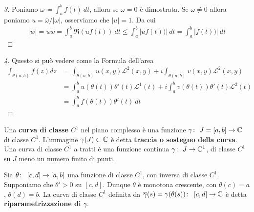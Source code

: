 \begin{proof}[3]
	Poniamo $\omega \coloneqq \int_{a}^{b} f(t)\ dt$, allora se $\omega = 0$ è dimostrata. Se $\omega \neq 0$ allora poniamo $u = \overline{\omega}/|\omega|$, osserviamo che $|u|=1$. Da cui
	\begin{equation*}
	\begin{aligned}
	|w| = uw = \int_{a}^b \Re(uf(t))\ dt \le \int_{a}^b |uf(t))|\ dt = \int_{a}^b |f(t))|\ dt  
	\end{aligned}
	\end{equation*}
\end{proof}

\begin{proof}[4]
	Questo si può vedere come la Formula dell'area  
	\begin{equation*}
	\begin{aligned}
	\int_{\theta(a,b)} f(z) dz & = \int_{\theta(a,b)} u(x,y) \mathcal{L}^2(x,y)
	+ i\int_{\theta(a,b)} v(x,y) \mathcal{L}^2(x,y)\\
	& = \int_a^b u(\theta(t))\theta'(t) \mathcal{L}^1(t) 
	+ i\int^b_a v(\theta(t))\theta'(t) \mathcal{L}^2(t)\\
	& = \int_a^b f(\theta(t)) \theta'(t)\ dt		
	\end{aligned}
	\end{equation*}
\end{proof}

\begin{definition}
	\label{defn:curva-c1}
	Una \textbf{curva di classe $C^1$} nel piano complesso è una funzione $\gamma \colon\ J=\left[a,b\right] \rightarrow \mathbb{C}$ di classe $C^1$. L'immagine $\gamma(J) \subset \mathbb{C}$ è detta \textbf{traccia o sostegno della curva}. Una curva di classe $C^1$ a tratti è una funzione continua $\gamma \colon\ J \rightarrow \mathbb{C}^1$, di classe $C^1$ su $J$ meno un numero finito di punti. 		
\end{definition}

\begin{definition}
	\label{defn:riparametrizzazione-curva-classe-c1}
	Sia $\theta \colon\ \left[c,d\right] \rightarrow \left[a,b\right]$ una funzione di classe $C^1$, con inversa di classe $C^1$. Supponiamo che $\theta' > 0$ su $\left[c, d\right]$. Dunque $\theta$ è monotona crescente, con $\theta(c) = a$, $\theta(d) = b$. La curva di classe $C^1$ definita da $\overline{\gamma}(s) = \gamma(\theta (s)) \colon\ \left[c,d\right] \rightarrow \mathbb{C}$ è detta \textbf{riparametrizzazione di $\gamma$}.
\end{definition}

